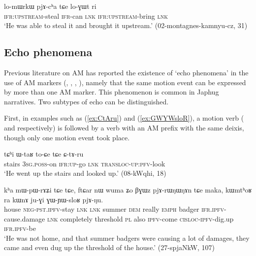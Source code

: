\begin{exe}
\ex \label{ex:lomWrkW}
 \gll lo-mɯrkɯ pjɤ-cʰa tɕe lo-ɣɯt ri \\
 \textsc{ifr}:\textsc{upstream}-steal \textsc{ifr}-can \textsc{lnk} \textsc{ifr}:\textsc{upstream}-bring \textsc{lnk} \\
\glt `He was able to steal it and brought it upstream.' (02-montagnes-kamnyu-cz, 31)
\end{exe}

\subsection{Echo phenomena} \label{sec:AM.echo}
Previous literature on AM has reported the existence of `echo phenomena' in the use of AM markers (\citealt[251]{wilkins91associated.motion}, \citealt[681-683]{vuillermet12eseejja}, \citealt[128-130]{rose15am}, \citealt[11]{guillaume16am}), namely that the same motion event can be expressed by more than one AM marker. This phenomenon is common in Japhug narratives. Two subtypes of echo can be distinguished.

First, in examples such as (\ref{ex:CtAru}) and (\ref{ex:GWYWsloR}), a motion verb ( and  respectively) is followed by a verb with an AM prefix with the same deixis, though only one motion event took place.

\begin{exe}
\ex \label{ex:CtAru}
\gll tɕʰi ɯ-taʁ to-ɕe tɕe ɕ-tɤ-ru   \\
stairs \textsc{3sg}.\textsc{poss}-on \textsc{ifr}:\textsc{up}-go \textsc{lnk}  \textsc{transloc}-\textsc{up}:\textsc{pfv}-look \\
\glt `He went up the stairs and looked up.'  (08-kWqhi, 18)
\end{exe}

\begin{exe}
\ex \label{ex:GWYWsloR}
\gll kʰa mɯ-pɯ-rɤʑi tɕe tɕe, ftɕar nɯ wuma ʑo βɣɯz pjɤ-rɯŋɯŋɤn tɕe maka,
kɯmtʰoʁ ra kɯnɤ ju-ɣi ɣɯ-ɲɯ-sloʁ pjɤ-ŋu. \\
house \textsc{neg}-\textsc{pst}.\textsc{ipfv}-stay \textsc{lnk} \textsc{lnk} summer \textsc{dem} really \textsc{emph} badger \textsc{ifr}.\textsc{ipfv}-cause.damage \textsc{lnk} completely threshold \textsc{pl} also \textsc{ipfv}-come \textsc{cisloc}-\textsc{ipfv}-dig.up \textsc{ifr}.\textsc{ipfv}-be \\
\glt `He was not home, and that summer badgers were causing a lot of damages, they came and even dug up  the threshold of the house.'  (27-spjaNkW, 107)
\end{exe}

